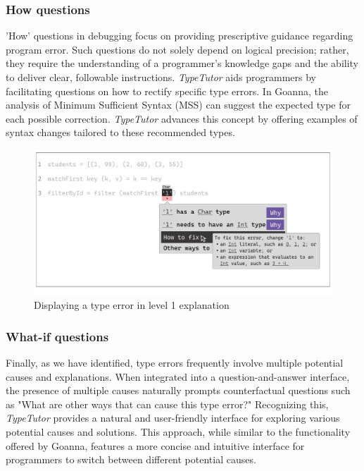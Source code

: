 \subsubsection{How questions}

'How' questions in debugging focus on providing prescriptive guidance regarding program error. Such questions do not solely depend on logical precision; rather, they require the understanding of a programmer's knowledge gaps and the ability to deliver clear, followable instructions. \textit{TypeTutor} aids programmers by facilitating questions on how to rectify specific type errors. In Goanna, the analysis of Minimum Sufficient Syntax (MSS) can suggest the expected type for each possible correction. \textit{TypeTutor} advances this concept by offering examples of syntax changes tailored to these recommended types. 



\begin{figure}[hbt]
  \includegraphics[width=\linewidth]{How}
  \caption{
      Displaying a type error in level 1 explanation
    }
\end{figure}

\subsubsection{What-if questions}
Finally, as we have identified, type errors frequently involve multiple potential causes and explanations. When integrated into a question-and-answer interface, the presence of multiple causes naturally prompts counterfactual questions such as "What are other ways that can cause this type error?" Recognizing this, \textit{TypeTutor} provides a natural and user-friendly interface for exploring various potential causes and solutions. This approach, while similar to the functionality offered by Goanna, features a more concise and intuitive interface for programmers to switch between different potential causes.

